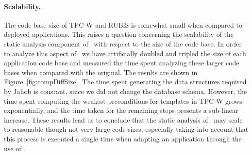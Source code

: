 \paragraph{Scalability.} The code base size of TPC-W and RUBiS is somewhat
small when compared to deployed applications.  This raises a question
concerning the scalability of the static analysis component of
\tool\ with respect to the size of the code base. In order to analyze this aspect of \tool\ 
we have artificially doubled and tripled the size of each application
code base and measured the time spent analyzing these larger
code bases when compared with the original. The results are shown in
Figure~\ref{fig:compDiffSize}. The time spent generating the
data structures required by Jahob is constant, since we did not
change the database schema. However, the time spent
computing the weakest preconditions for templates in TPC-W grows
exponentially, and the time taken for the remaining steps presents a
sub-linear increase. These results lead us to conclude
that the static analysis of \tool\ may scale to reasonable though not very large code sizes,
especially taking into account that this process is executed a single
time when adapting an application through the use of \tool.
